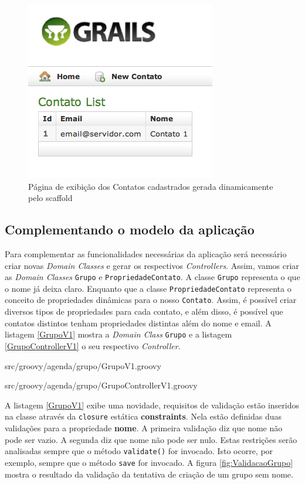 \documentclass[12pt]{article}
\begin{document}
   \begin{figure}[h!]
      \centering
      \includegraphics[width=.3\textwidth]{images/listContactScaffold.png}
      \caption{Página de exibição dos Contatos cadastrados gerada dinamicamente pelo scaffold}
      \label{fig:listContactScaffold}
  \end{figure}
  
\subsection{Complementando o modelo da aplicação}

  Para complementar as funcionalidades necessárias da aplicação será necessário 
  criar novas \emph{Domain Classes} e gerar os respectivos \emph{Controllers}. 
  Assim, vamos criar as \emph{Domain Classes} \texttt{Grupo} e \texttt{PropriedadeContato}.
  A classe \texttt{Grupo} representa o que o nome já deixa claro. Enquanto que a classe
  \texttt{PropriedadeContato} representa o conceito de propriedades dinâmicas para
  o nosso \texttt{Contato}. Assim, é possível criar diversos tipos de propriedades 
  para cada contato, e além disso, é possível que contatos distintos te\-nham propriedades
  distintas além do nome e email. A listagem \ref{GrupoV1} mostra a \emph{Domain Class}
  \texttt{Grupo} e a listagem \ref{GrupoControllerV1} o seu respectivo \emph{Controller}. 
  
  
                  {src/groovy/agenda/grupo/GrupoV1.groovy}
 
  
                  {src/groovy/agenda/grupo/GrupoControllerV1.groovy}
 
  A listagem \ref{GrupoV1} exibe uma novidade, requisitos de validação estão inseridos
  na classe através da \texttt{closure} estática \textbf{constraints}.
  Nela estão definidas duas validações para a propriedade \textbf{nome}. A primeira
  validação diz que nome não pode ser vazio. A segunda diz que nome não pode ser
  nulo. Estas restrições serão analisadas sempre que o método \texttt{validate()} 
  for invocado. Isto ocorre, por exemplo, sempre que o método \texttt{save} for 
  invocado. A figura \ref{fig:ValidacaoGrupo} mostra o resultado da validação da 
  tentativa de criação de um grupo sem nome.
  
\end{document}
